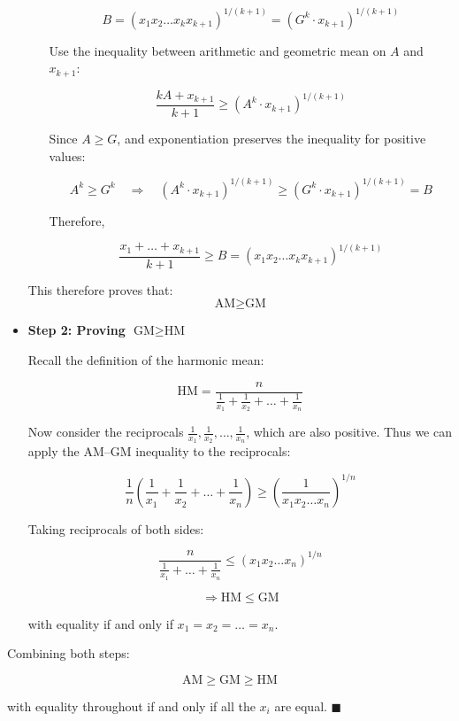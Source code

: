 \documentclass[twoside]{book}
\begin{document}
\begin{itemize}
\begin{itemize}
\[
B = \left( x_1 x_2 \dots x_k x_{k+1} \right)^{1/(k+1)} = \left( G^k \cdot x_{k+1} \right)^{1/(k+1)}
\]

Use the inequality between arithmetic and geometric mean on \( A \) and \( x_{k+1} \):

\[
\frac{kA + x_{k+1}}{k + 1} \geq \left( A^k \cdot x_{k+1} \right)^{1/(k+1)}
\]

Since \( A \geq G \), and exponentiation preserves the inequality for positive values:

\[
A^k \geq G^k \quad \Rightarrow \quad \left( A^k \cdot x_{k+1} \right)^{1/(k+1)} \geq \left( G^k \cdot x_{k+1} \right)^{1/(k+1)} = B
\]

Therefore,

\[
\frac{x_1 + \dots + x_{k+1}}{k + 1} \geq B = \left( x_1 x_2 \dots x_k x_{k+1} \right)^{1/(k+1)}
\]
\end{itemize}

This therefore proves that:
\[
\text{AM} \geq \text{GM}
\]

\medskip

\item \textbf{Step 2: Proving \( \text{GM} \geq \text{HM} \)}

Recall the definition of the harmonic mean:

\[
\text{HM} = \frac{n}{\frac{1}{x_1} + \frac{1}{x_2} + \dots + \frac{1}{x_n}}
\]

Now consider the reciprocals \( \frac{1}{x_1}, \frac{1}{x_2}, \dots, \frac{1}{x_n} \), which are also positive. Thus we can apply the AM–GM inequality to the reciprocals:

\[
\frac{1}{n} \left( \frac{1}{x_1} + \frac{1}{x_2} + \dots + \frac{1}{x_n} \right) \geq \left( \frac{1}{x_1 x_2 \dots x_n} \right)^{1/n}
\]

Taking reciprocals of both sides:

\[
\frac{n}{\frac{1}{x_1} + \dots + \frac{1}{x_n}} \leq \left( x_1 x_2 \dots x_n \right)^{1/n}
\]

\[
\Rightarrow \text{HM} \leq \text{GM}
\]

with equality if and only if \( x_1 = x_2 = \dots = x_n \).
\end{itemize}

\medskip

Combining both steps:

\[
\text{AM} \geq \text{GM} \geq \text{HM}
\]

with equality throughout if and only if all the \( x_i \) are equal.
\hfill $\blacksquare$
\end{document}

